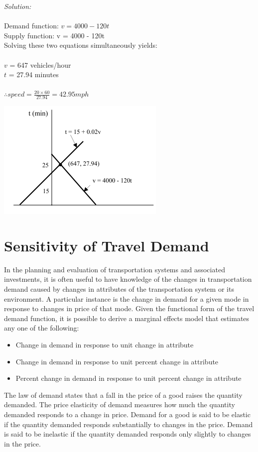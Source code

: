 \textit{Solution:}\\\\
Demand function: $v = 4000 - 120t$\\
Supply function: v = 4000 - 120t\\
Solving these two equations simultaneously yields:\\\\
$v$ = 647 vehicles/hour\\
$t$ = 27.94 minutes\\\\
$ \therefore speed = \frac{20 \times 60}{27.94} = 42.95 mph$
\begin{center}
	\includegraphics{gfx/fig45.png}
\end{center}
%
\section{Sensitivity of Travel Demand}
In the planning and evaluation of transportation systems and associated investments, it is often useful to have knowledge of the changes in transportation demand caused by changes in attributes of the transportation system or its environment. A particular instance is the change in demand for a given mode in response to changes in price of that mode. Given the functional form of the travel demand function, it is possible to derive a marginal effects model that estimates any one of the following:
\begin{itemize}
	\item Change in demand in response to unit change in attribute
	\item Change in demand in response to unit percent change in attribute
	\item Percent change in demand in response to unit percent change in attribute
\end{itemize}
The law of demand states that a fall in the price of a good raises the quantity demanded. The price elasticity of demand measures how much the quantity demanded responds to a change in price. Demand for a good is said to be elastic if the quantity demanded responds substantially to changes in the price. Demand is said to be inelastic if the quantity demanded responds only slightly to changes in the price.

